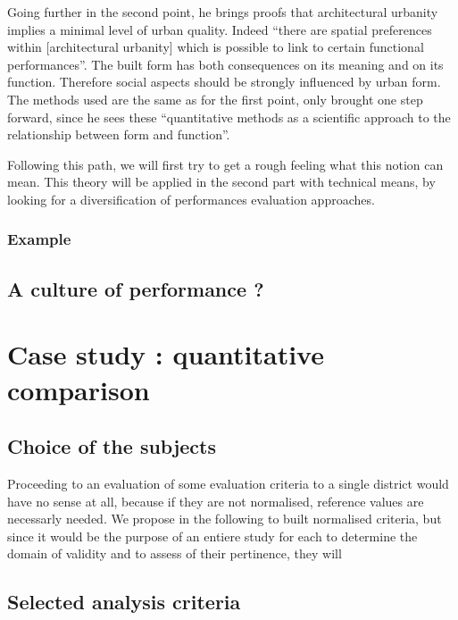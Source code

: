 \documentclass[english]{article}
\begin{document}
\bigskip{}


Going further in the second point, he brings proofs that architectural
urbanity implies a minimal level of urban quality. Indeed ``there
are spatial preferences within {[}architectural urbanity{]} which
is possible to link to certain functional performances''. The built
form has both consequences on its meaning and on its function. Therefore
social aspects should be strongly influenced by urban form. The methods
used are the same as for the first point, only brought one step forward, since
he sees these ``quantitative methods as a scientific approach to
the relationship between form and function''.

\bigskip{}


Following this path, we will first try to get a rough feeling what
this notion can mean. This theory will be applied in the second part
with technical means, by looking
for a diversification of performances evaluation approaches.


\subsubsection{Example}


\subsection{A culture of performance ?}


\section{Case study : quantitative comparison}


\subsection{Choice of the subjects}

Proceeding to an evaluation of some evaluation criteria to a single
district would have no sense at all, because if they are not normalised,
reference values are necessarly needed. We propose in the following
to built normalised criteria, but since it would be the purpose of
an entiere study for each to determine the domain of validity and
to assess of their pertinence, they will


\subsection{Selected analysis criteria}
\end{document}
